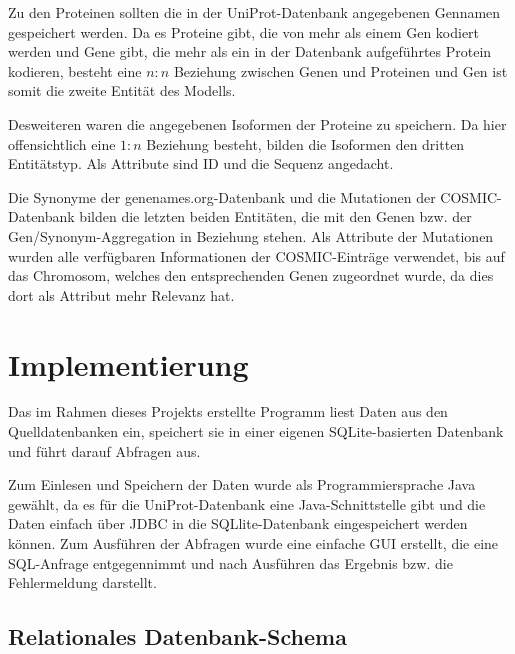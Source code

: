 \documentclass{scrartcl}
\begin{document}
Zu den Proteinen sollten die in der UniProt-Datenbank angegebenen Gennamen gespeichert werden. Da es Proteine gibt, die von mehr als einem Gen kodiert werden und Gene gibt, die mehr als ein in der Datenbank aufgeführtes Protein kodieren, besteht eine $n:n$ Beziehung zwischen Genen und Proteinen und Gen ist somit die zweite Entität des Modells.

Desweiteren waren die angegebenen Isoformen der Proteine zu speichern. Da hier offensichtlich eine $1:n$ Beziehung besteht, bilden die Isoformen den dritten Entitätstyp. Als Attribute sind ID und die Sequenz angedacht.

Die Synonyme der genenames.org-Datenbank und die Mutationen der COSMIC-Datenbank bilden die letzten beiden Entitäten, die mit den Genen bzw. der Gen/Synonym-Aggregation in Beziehung stehen. Als Attribute der Mutationen wurden alle verfügbaren Informationen der COSMIC-Einträge verwendet, bis auf das Chromosom, welches den entsprechenden Genen zugeordnet wurde, da dies dort als Attribut mehr Relevanz hat.

\section{Implementierung}

Das im Rahmen dieses Projekts erstellte Programm liest Daten aus den Quelldatenbanken ein, speichert sie in einer eigenen SQLite-basierten Datenbank und führt darauf Abfragen aus.

Zum Einlesen und Speichern der Daten wurde als Programmiersprache Java gewählt, da es für die UniProt-Datenbank eine Java-Schnittstelle gibt und die Daten einfach über JDBC in die SQLlite-Datenbank eingespeichert werden können. Zum Ausführen der Abfragen wurde eine einfache GUI erstellt, die eine SQL-Anfrage entgegennimmt und nach Ausführen das Ergebnis bzw. die Fehlermeldung darstellt.

\subsection{Relationales Datenbank-Schema}
\end{document}
